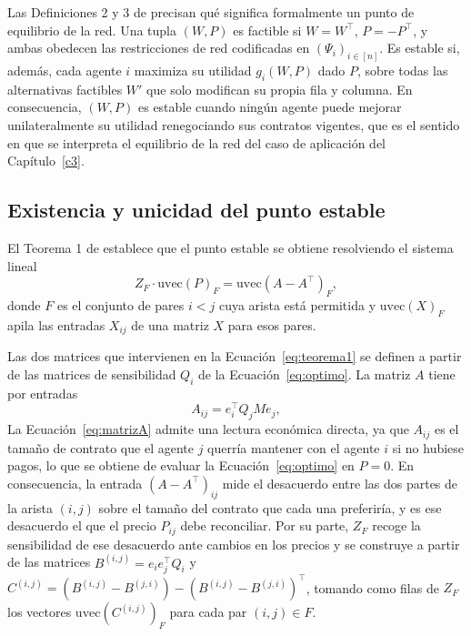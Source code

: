 Las Definiciones 2 y 3 de  precisan qué
significa formalmente un punto de equilibrio de la red. Una tupla $(W,P)$ es factible si $W=W^\top$, $P=-P^\top$, y ambas obedecen las restricciones de red codificadas en $(\Psi_i)_{i\in[n]}$. Es estable si, además, cada agente $i$ maximiza su utilidad $g_i(W,P)$ dado $P$, sobre todas las alternativas factibles $W'$ que solo modifican su propia fila y columna. En consecuencia, $(W,P)$ es estable cuando ningún agente puede mejorar unilateralmente su utilidad renegociando sus contratos vigentes, que es el sentido en que se interpreta el equilibrio de la red del caso de aplicación del Capítulo~\ref{c3}.

\subsection{Existencia y unicidad del punto estable}
\label{c24:teorema1}

El Teorema 1 de  establece que el punto estable se obtiene resolviendo el sistema lineal
\begin{equation}
\label{eq:teorema1}
    Z_F \cdot \mathrm{uvec}(P)_F = \mathrm{uvec}(A-A^\top)_F ,
\end{equation}
donde $F$ es el conjunto de pares $i<j$ cuya arista está permitida y $\mathrm{uvec}(X)_F$ apila las entradas $X_{ij}$ de una matriz $X$ para esos pares.

Las dos matrices que intervienen en la Ecuación~\eqref{eq:teorema1} se definen a partir de las matrices de sensibilidad $Q_i$ de la Ecuación~\eqref{eq:optimo}. La matriz $A$ tiene por entradas
\begin{equation}
\label{eq:matrizA}
    A_{ij} = e_i^\top Q_j M e_j ,
\end{equation}
La Ecuación~\eqref{eq:matrizA} admite una lectura económica directa, ya que $A_{ij}$ es el tamaño de contrato que el agente $j$ querría mantener con el agente $i$ si no hubiese pagos, lo que se obtiene de evaluar la Ecuación~\eqref{eq:optimo} en $P=0$. En consecuencia, la entrada $(A-A^\top)_{ij}$ mide el desacuerdo entre las dos partes de la arista $(i,j)$ sobre el tamaño del contrato que cada una preferiría, y es ese desacuerdo el que el precio $P_{ij}$ debe reconciliar. Por su parte, $Z_F$ recoge la sensibilidad de ese desacuerdo ante cambios en los precios y se construye a partir de las matrices $B^{(i,j)} = e_i e_j^\top Q_i$ y $C^{(i,j)} = (B^{(i,j)} - B^{(j,i)}) - (B^{(i,j)} - B^{(j,i)})^\top$, tomando como filas de $Z_F$ los vectores $\mathrm{uvec}(C^{(i,j)})_F$ para cada par $(i,j) \in F$.

